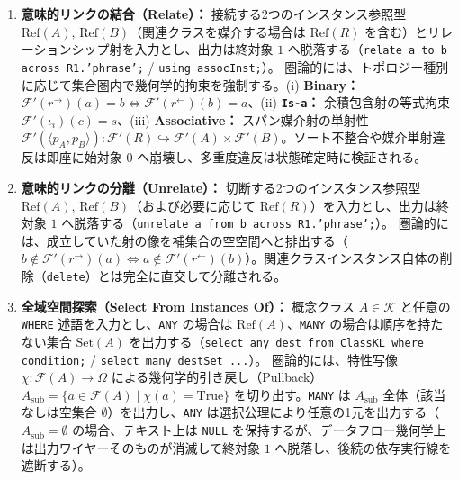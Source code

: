 \documentclass[11pt,a4paper]{ltjsarticle}
\theoremstyle{definition}
\theoremstyle{plain}
\theoremstyle{remark}
\begin{document}
\begin{enumerate}[label=\textbf{(\arabic*)}, leftmargin=*]
    \item \textbf{意味的リンクの結合（Relate）：}
    接続する2つのインスタンス参照型 $\mathrm{Ref}(A),\, \mathrm{Ref}(B)$（関連クラスを媒介する場合は $\mathrm{Ref}(R)$ を含む）とリレーションシップ射を入力とし、出力は終対象 $1$ へ脱落する（\texttt{relate a to b across R1.'phrase';} / \texttt{using assocInst;}）。
    圏論的には、トポロジー種別に応じて集合圏内で幾何学的拘束を強制する。(i) \textbf{Binary：} $\mathcal{F}'(r^{\rightarrow})(a) = b \iff \mathcal{F}'(r^{\leftarrow})(b) = a$、(ii) \textbf{\texttt{Is-a}：} 余積包含射の等式拘束 $\mathcal{F}'(\iota_i)(c) = s$、(iii) \textbf{Associative：} スパン媒介射の単射性 $\mathcal{F}'(\langle p_A, p_B \rangle) : \mathcal{F}'(R) \hookrightarrow \mathcal{F}'(A) \times \mathcal{F}'(B)$。ソート不整合や媒介単射違反は即座に始対象 $0$ へ崩壊し、多重度違反は状態確定時に検証される。

    \item \textbf{意味的リンクの分離（Unrelate）：}
    切断する2つのインスタンス参照型 $\mathrm{Ref}(A),\, \mathrm{Ref}(B)$（および必要に応じて $\mathrm{Ref}(R)$）を入力とし、出力は終対象 $1$ へ脱落する（\texttt{unrelate a from b across R1.'phrase';}）。
    圏論的には、成立していた射の像を補集合の空空間へと排出する（$b \notin \mathcal{F}'(r^{\rightarrow})(a) \iff a \notin \mathcal{F}'(r^{\leftarrow})(b)$）。関連クラスインスタンス自体の削除（\texttt{delete}）とは完全に直交して分離される。

    \item \textbf{全域空間探索（Select From Instances Of）：}
    概念クラス $A \in \mathcal{K}$ と任意の \texttt{WHERE} 述語を入力とし、\texttt{ANY} の場合は $\mathrm{Ref}(A)$、\texttt{MANY} の場合は順序を持たない集合 $\mathrm{Set}(A)$ を出力する（\texttt{select any dest from ClassKL where condition;} / \texttt{select many destSet ...}）。
    圏論的には、特性写像 $\chi : \mathcal{F}(A) \to \Omega$ による幾何学的引き戻し（Pullback）$A_{\mathrm{sub}} = \{a \in \mathcal{F}(A) \mid \chi(a) = \mathrm{True}\}$ を切り出す。\texttt{MANY} は $A_{\mathrm{sub}}$ 全体（該当なしは空集合 $\emptyset$）を出力し、\texttt{ANY} は選択公理により任意の1元を出力する（$A_{\mathrm{sub}} = \emptyset$ の場合、テキスト上は \texttt{NULL} を保持するが、データフロー幾何学上は出力ワイヤーそのものが消滅して終対象 $1$ へ脱落し、後続の依存実行線を遮断する）。


\end{enumerate}
\end{document}
